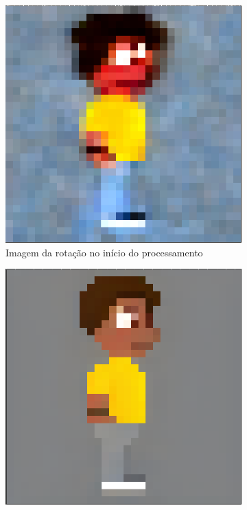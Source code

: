 \begin{figure}[htbp]
    \centering
    \caption{\small Etapas do processamento da geração de imagem no Pixel Lab}
    \label{fig:pixelLabRotProcesso}
    \begin{subfigure}{0.32\linewidth}
        \centering
        \includegraphics[width=1\linewidth]{figs/pixelLab/dia2/cores_tudo_estranha.PNG}
        \caption{\small Imagem da rotação no início do processamento}
        \label{fig:pixelLabProcesso1}
    \end{subfigure}
    \begin{subfigure}{0.32\linewidth}
        \centering
        \includegraphics[width=1\linewidth]{figs/pixelLab/dia2/perna_antes_de_sumir.PNG}

\end{subfigure}
\end{figure}
